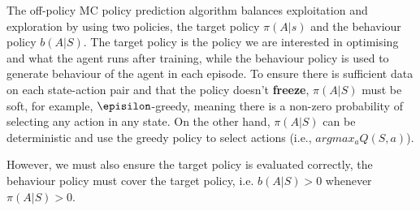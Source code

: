 The off-policy MC policy prediction algorithm balances exploitation and exploration by
using two policies, the target policy $\pi(A|s)$ and the behaviour policy $b(A|S)$. 
The target policy is the policy we are interested in optimising and what the agent runs after training, while the behaviour 
policy is used to generate behaviour of the agent in each episode. To ensure
there is sufficient data on each state-action pair and that the policy doesn't \textbf{freeze},
$\pi(A|S)$ must be soft, for example, $\episilon$-greedy, meaning there is a non-zero probability
of selecting any action in any state. On the other hand, $\pi(A|S)$ can be deterministic and use
the greedy policy to select actions (i.e., $argmax_a Q(S, a)$).

However, we must also ensure the target policy is evaluated correctly, the behaviour policy must cover the
target policy, i.e. $b(A|S) > 0$ whenever $\pi(A|S) > 0$.
